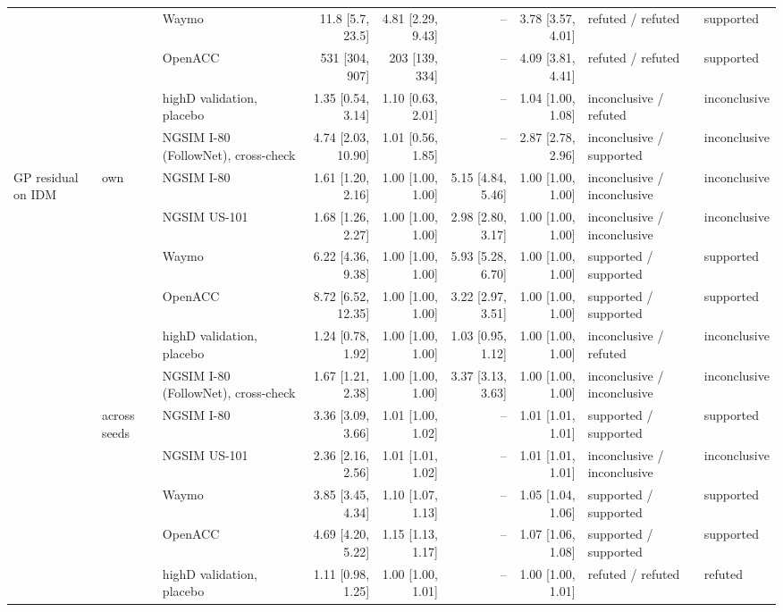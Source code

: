 \begin{longtable}{lllrrrrll}
 &  & Waymo & 11.8 [5.7, 23.5] & 4.81 [2.29, 9.43] & -- & 3.78 [3.57, 4.01] & refuted / refuted & supported \\
 &  & OpenACC & 531 [304, 907] & 203 [139, 334] & -- & 4.09 [3.81, 4.41] & refuted / refuted & supported \\
 &  & highD validation, placebo & 1.35 [0.54, 3.14] & 1.10 [0.63, 2.01] & -- & 1.04 [1.00, 1.08] & inconclusive / refuted & inconclusive \\
 &  & NGSIM I-80 (FollowNet), cross-check & 4.74 [2.03, 10.90] & 1.01 [0.56, 1.85] & -- & 2.87 [2.78, 2.96] & inconclusive / supported & inconclusive \\
\midrule
GP residual on IDM & own & NGSIM I-80 & 1.61 [1.20, 2.16] & 1.00 [1.00, 1.00] & 5.15 [4.84, 5.46] & 1.00 [1.00, 1.00] & inconclusive / inconclusive & inconclusive \\
 &  & NGSIM US-101 & 1.68 [1.26, 2.27] & 1.00 [1.00, 1.00] & 2.98 [2.80, 3.17] & 1.00 [1.00, 1.00] & inconclusive / inconclusive & inconclusive \\
 &  & Waymo & 6.22 [4.36, 9.38] & 1.00 [1.00, 1.00] & 5.93 [5.28, 6.70] & 1.00 [1.00, 1.00] & supported / supported & supported \\
 &  & OpenACC & 8.72 [6.52, 12.35] & 1.00 [1.00, 1.00] & 3.22 [2.97, 3.51] & 1.00 [1.00, 1.00] & supported / supported & supported \\
 &  & highD validation, placebo & 1.24 [0.78, 1.92] & 1.00 [1.00, 1.00] & 1.03 [0.95, 1.12] & 1.00 [1.00, 1.00] & inconclusive / refuted & inconclusive \\
 &  & NGSIM I-80 (FollowNet), cross-check & 1.67 [1.21, 2.38] & 1.00 [1.00, 1.00] & 3.37 [3.13, 3.63] & 1.00 [1.00, 1.00] & inconclusive / inconclusive & inconclusive \\
\midrule
 & across seeds & NGSIM I-80 & 3.36 [3.09, 3.66] & 1.01 [1.00, 1.02] & -- & 1.01 [1.01, 1.01] & supported / supported & supported \\
 &  & NGSIM US-101 & 2.36 [2.16, 2.56] & 1.01 [1.01, 1.02] & -- & 1.01 [1.01, 1.01] & inconclusive / inconclusive & inconclusive \\
 &  & Waymo & 3.85 [3.45, 4.34] & 1.10 [1.07, 1.13] & -- & 1.05 [1.04, 1.06] & supported / supported & supported \\
 &  & OpenACC & 4.69 [4.20, 5.22] & 1.15 [1.13, 1.17] & -- & 1.07 [1.06, 1.08] & supported / supported & supported \\
 &  & highD validation, placebo & 1.11 [0.98, 1.25] & 1.00 [1.00, 1.01] & -- & 1.00 [1.00, 1.01] & refuted / refuted & refuted \\

\end{longtable}
